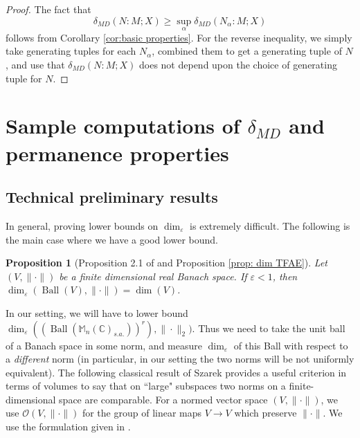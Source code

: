 \documentclass[10pt]{amsart}
\newtheorem{prop}[thm]{Proposition}
\theoremstyle{definition}
\numberwithin{equation}{section}
\newcommand{\bC}{{\mathbb C}}
\newcommand{\bM}{{\mathbb M}}
\DeclareMathOperator{\Ball}{Ball}
\begin{document}
\begin{proof}
The fact that 
 \[\delta_{MD}(N:M;X)\geq \sup_{\alpha}\delta_{MD}(N_{\alpha}:M;X)\]
follows from Corollary \ref{cor:basic properties}.
For the reverse inequality, we simply take generating tuples for each $N_{\alpha}$, combined them to get a generating tuple of $N$, and use that $\delta_{MD}(N:M;X)$ does not depend upon the choice of generating tuple for $N$. 


\end{proof}


\section{Sample computations of $\delta_{MD}$ and permanence properties}


\subsection{Technical preliminary results}

In general, proving lower bounds on $\dim_{\varepsilon}$ is extremely difficult. The following is the main case where we have a good lower bound. 


\begin{prop}[Proposition 2.1 of \cite{Tsuka} and Proposition \ref{prop: dim TFAE}]\label{prop:Banach space computation}
Let $(V,\|\cdot\|)$ be a finite dimensional real Banach space. If $\varepsilon<1$, then $\dim_{\varepsilon}(\Ball(V),\|\cdot\|)=\dim(V)$.
\end{prop}

In our setting, we will have to lower bound $\dim_{\varepsilon}((\Ball(\bM_{n}(\bC)_{s.a.}))^{r}),\|\cdot\|_{2})$. Thus we need to take the unit ball of a Banach space in some norm, and measure $\dim_{\varepsilon}$ of this Ball with respect to a \emph{different} norm (in particular, in our setting the two norms will be not uniformly equivalent). The following classical result of Szarek \cite{SzarekAlmostEuc, STALmostEuc} provides a useful criterion in terms of volumes to say that on ``large" subspaces two norms on a finite-dimensional space are comparable. For a normed vector space $(V,\|\cdot\|)$, we use $\mathcal{O}(V,\|\cdot\|)$ for the group of linear maps $V\to V$ which preserve $\|\cdot\|$.  We use the formulation given in \cite{Pis}.
\end{document}
